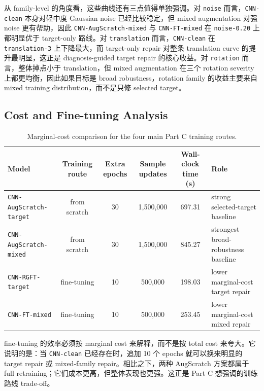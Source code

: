\documentclass[12pt,a4paper,fontset=fandol]{ctexart}
\begin{document}
从 family-level 的角度看，这些曲线还有三点值得单独强调。对 \texttt{noise} 而言，\texttt{CNN-clean} 本身对轻中度 Gaussian noise 已经比较稳定，但 mixed augmentation 对强 noise 更有帮助，因此 \texttt{CNN-AugScratch-mixed} 与 \texttt{CNN-FT-mixed} 在 \texttt{noise-0.20} 上都明显优于 target-only 路线。对 \texttt{translation} 而言，\texttt{CNN-clean} 在 \texttt{translation-3} 上下降最大，而 target-only repair 对整条 translation curve 的提升最明显，这正是 diagnosis-guided target repair 的核心收益。对 \texttt{rotation} 而言，整体掉点小于 translation，但 mixed augmentation 在三个 rotation severity 上都更均衡，因此如果目标是 broad robustness，rotation family 的收益主要来自 mixed training distribution，而不是只修 selected target。

\subsection{Cost and Fine-tuning Analysis}

\begin{table}[H]
  \centering
  \scriptsize
  \caption{Marginal-cost comparison for the four main Part C training routes.}
  \renewcommand{\arraystretch}{1.08}
  \setlength{\tabcolsep}{4pt}
  \begin{tabular}{lccccp{4.2cm}}
    \toprule
    Model & Training route & Extra epochs & Sample updates & Wall-clock time (s) & Role \\
    \midrule
    \texttt{CNN-AugScratch-target} & from scratch & 30 & 1{,}500{,}000 & 697.31 & strong selected-target baseline \\
    \texttt{CNN-AugScratch-mixed} & from scratch & 30 & 1{,}500{,}000 & 845.27 & strongest broad-robustness baseline \\
    \texttt{CNN-RGFT-target} & fine-tuning & 10 & 500{,}000 & 198.03 & lower marginal-cost target repair \\
    \texttt{CNN-FT-mixed} & fine-tuning & 10 & 500{,}000 & 253.45 & lower marginal-cost mixed repair \\
    \bottomrule
  \end{tabular}
\end{table}

fine-tuning 的效率必须按 marginal cost 来解释，而不是按 total cost 来夸大。它说明的是：当 \texttt{CNN-clean} 已经存在时，追加 10 个 epochs 就可以换来明显的 target repair 或 mixed-family repair。相比之下，两种 AugScratch 方案都属于 full retraining；它们成本更高，但整体表现也更强。这正是 Part C 想强调的训练路线 trade-off。
\end{document}
